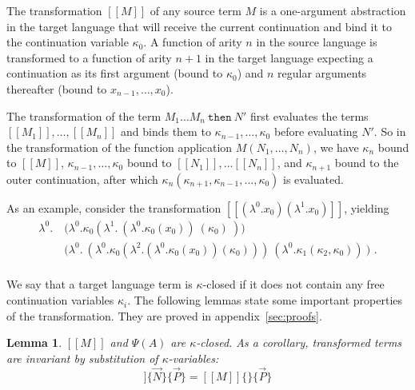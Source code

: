 \documentclass[a4paper,11pt,draft]{article}
\newcommand{\kw}[1]{\mathtt{#1}}
\newtheorem{lemma}{\sffamily Lemma}
\begin{document}
The transformation $[\![M]\!]$ of any source term $M$ is a one-argument
abstraction in the target language that will receive the current continuation
and bind it to the continuation variable $\kappa_{0}$. A function of arity $n$
in the source language is transformed to a function of arity $n+1$ in the
target language expecting a continuation as its first argument (bound
to $\kappa_{0}$) and $n$ regular arguments thereafter
(bound to $x_{n-1}, \ldots, x_{0}$).

The transformation of the term $M_{1} \ldots M_{n} \: \kw{then} \: N'$ first
evaluates the terms
$[\![M_{1}]\!], \ldots, [\![M_{n}]\!]$ and binds them to
$\kappa_{n-1}, \ldots, \kappa_{0}$ before evaluating $N'$. So in the
transformation of the function application
$M(N_{1}, \ldots, N_{n})$, we have $\kappa_{n}$ bound to $[\![M]\!]$,
$\kappa_{n-1}, \ldots, \kappa_{0}$ bound to $[\![N_{1}]\!], \ldots [\![N_{n}]\!]$,
and $\kappa_{n+1}$ bound to the outer continuation, after which
$\kappa_{n}(\kappa_{n+1}, \kappa_{n-1}, \ldots, \kappa_{0})$ is evaluated.

As an example, consider the transformation
$[\![(\lambda^{0}.x_{0})(\lambda^{1}.x_{0})]\!]$, yielding
\begin{align*}
  \lambda^{0}. \:& \bigl( \lambda^{0}.\kappa_{0}(\lambda^{1}. \: (\lambda^{0}.\kappa_{0}(x_{0})) \: (\kappa_{0}) \: ) \bigr)\\
  & \bigl( \lambda^{0}. \: (\lambda^{0}.\kappa_{0}(\lambda^{2}.(\lambda^{0}.\kappa_{0}(x_{0}))(\kappa_{0}))) \: (\lambda^{0}.\kappa_{1}(\kappa_{2},\kappa_{
    0})) \: \bigr) \text{ .}
\end{align*}

\paragraph{}

We say that a target language term is $\kappa$-closed if it does not contain
any free continuation variables $\kappa_{i}$. The following lemmas state some
important properties of the transformation. They are proved in
appendix~\ref{sec:proofs}.

\begin{lemma}\label{lem:kappaclosed}
  $[\![M]\!]$ and $\Psi(A)$ are $\kappa$-closed. As a corollary, transformed
  terms are invariant by substitution of $\kappa$-variables:
  \begin{equation*}
    [\![M]\!]\{\vec{N}\}\{\vec{P}\} = [\![M]\!]\{\}\{\vec{P}\}
  \end{equation*}
\end{lemma}
\end{document}
